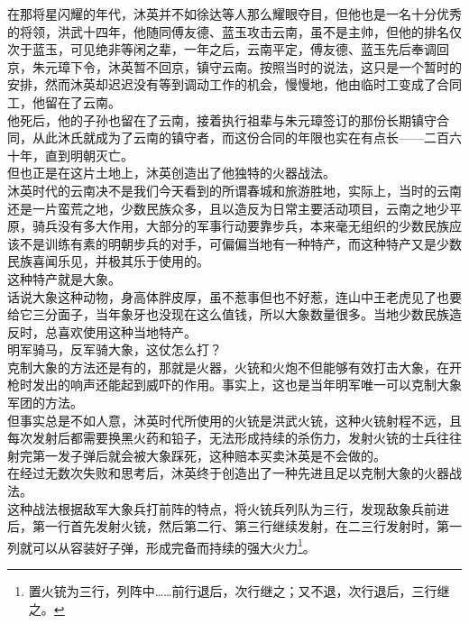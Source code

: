 \begin{multicols}{\theparacolNo}
在那将星闪耀的年代，沐英并不如徐达等人那么耀眼夺目，但他也是一名十分优秀的将领，洪武十四年，他随同傅友德、蓝玉攻击云南，虽不是主帅，但他的排名仅次于蓝玉，可见绝非等闲之辈，一年之后，云南平定，傅友德、蓝玉先后奉调回京，朱元璋下令，沐英暂不回京，镇守云南。按照当时的说法，这只是一个暂时的安排，然而沐英却迟迟没有等到调动工作的机会，慢慢地，他由临时工变成了合同工，他留在了云南。\\

他死后，他的子孙也留在了云南，接着执行祖辈与朱元璋签订的那份长期镇守合同，从此沐氏就成为了云南的镇守者，而这份合同的年限也实在有点长——二百六十年，直到明朝灭亡。\\

但也正是在这片土地上，沐英创造出了他独特的火器战法。\\

沐英时代的云南决不是我们今天看到的所谓春城和旅游胜地，实际上，当时的云南还是一片蛮荒之地，少数民族众多，且以造反为日常主要活动项目，云南之地少平原，骑兵没有多大作用，大部分的军事行动要靠步兵，本来毫无组织的少数民族应该不是训练有素的明朝步兵的对手，可偏偏当地有一种特产，而这种特产又是少数民族喜闻乐见，并极其乐于使用的。\\

这种特产就是大象。\\

话说大象这种动物，身高体胖皮厚，虽不惹事但也不好惹，连山中王老虎见了也要给它三分面子，当年象牙也没现在这么值钱，所以大象数量很多。当地少数民族造反时，总喜欢使用这种当地特产。\\

明军骑马，反军骑大象，这仗怎么打？\\

克制大象的方法还是有的，那就是火器，火铳和火炮不但能够有效打击大象，在开枪时发出的响声还能起到威吓的作用。事实上，这也是当年明军唯一可以克制大象军团的方法。\\

但事实总是不如人意，沐英时代所使用的火铳是洪武火铳，这种火铳射程不远，且每次发射后都需要换黑火药和铅子，无法形成持续的杀伤力，发射火铳的士兵往往射完第一发子弹后就会被大象踩死，这种赔本买卖沐英是不会做的。\\

在经过无数次失败和思考后，沐英终于创造出了一种先进且足以克制大象的火器战法。\\

这种战法根据敌军大象兵打前阵的特点，将火铳兵列队为三行，发现敌象兵前进后，第一行首先发射火铳，然后第二行、第三行继续发射，在二三行发射时，第一列就可以从容装好子弹，形成完备而持续的强大火力\footnote{置火铳为三行，列阵中……前行退后，次行继之；又不退，次行退后，三行继之。}。\\


\end{multicols}
